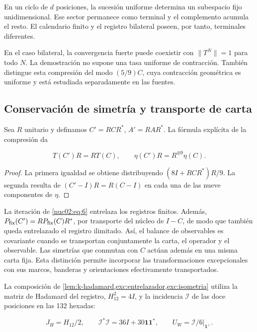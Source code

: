 \begin{corollary}
En un ciclo de \(d\) posiciones, la sucesión uniforme determina un subespacio fijo unidimensional. Ese sector permanece como terminal y el complemento acumula el resto. El calendario finito y el registro bilateral poseen, por tanto, terminales diferentes.
\end{corollary}

En el caso bilateral, la convergencia fuerte puede coexistir con \(\|T^N\|=1\) para todo \(N\). La demostración no supone una tasa uniforme de contracción. También distingue esta compresión del modo \((5/9)C\), cuya contracción geométrica es uniforme y está estudiada separadamente en las fuentes.

\subsection{Conservación de simetría y transporte de carta}

Sea \(R\) unitario y definamos \(C'=RCR^*\), \(A'=RAR^*\). La fórmula explícita de la compresión da

\begin{equation}
T(C')R=RT(C),\qquad
\eta(C')R=R^{\oplus9}\eta(C).\label{nuc02:eq:6}
\end{equation}

\begin{proof}
La primera igualdad se obtiene distribuyendo \((8I+RCR^*)R/9\). La segunda resulta de \((C'-I)R=R(C-I)\) en cada una de las nueve componentes de \(\eta\).
\end{proof}

La iteración de \eqref{nuc02:eq:6} entrelaza los registros finitos. Además, \(P_{\rm fix}(C')=RP_{\rm fix}(C)R^*\), por transporte del núcleo de \(I-C\), de modo que también queda entrelazado el registro ilimitado. Así, el balance de observables es covariante cuando se transportan conjuntamente la carta, el operador y el observable. Las simetrías que conmutan con \(C\) actúan además en una misma carta fija. Esta distinción permite incorporar las transformaciones excepcionales con sus marcos, banderas y orientaciones efectivamente transportados.

La composición de \cref{lem:k-hadamard,exc:entrelazador,exc:isometria} utiliza la matriz de Hadamard del registro, \(H_{12}^2=4I\), y la incidencia \(\mathcal I\) de las doce posiciones en las 132 hexadas:

\[
J_H=H_{12}/2,\qquad
\mathcal I^*\mathcal I=36I+30\mathbf1\mathbf1^*,\qquad
U_W=\mathcal I/6\big|_{\mathbf1^\perp}.
\]

